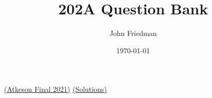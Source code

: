 \documentclass[answers]{exam}
\title{202A Question Bank}
\author{John Friedman}
\date{\today}
\begin{document}
\maketitle

\begin{questions}
    \question \href{https://drive.google.com/file/d/17jNHXrJJJaUyPh2Gd6xzIcf506MX_e40/view}{(Atkeson Final 2021)} \href{https://drive.google.com/file/d/18t6dfqYVieBBysjzgvnZYs1cErWWlmQK/view}{(Solutions)}
    
\end{questions}
\end{document}
